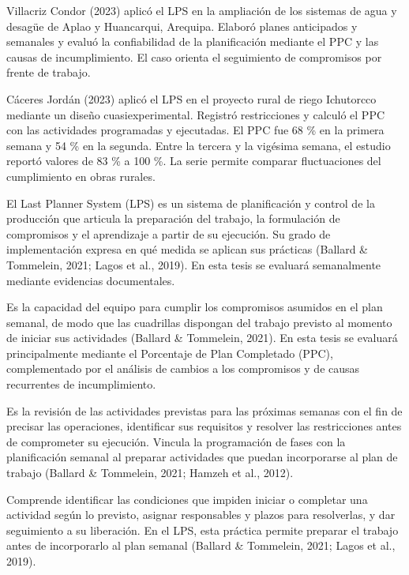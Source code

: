 \documentclass[12pt,a4paper]{article}
\begin{document}
Villacriz Condor (2023) aplicó el LPS en la ampliación de los sistemas de agua y desagüe de Aplao y Huancarqui, Arequipa. Elaboró planes anticipados y semanales y evaluó la confiabilidad de la planificación mediante el PPC y las causas de incumplimiento. El caso orienta el seguimiento de compromisos por frente de trabajo.

Cáceres Jordán (2023) aplicó el LPS en el proyecto rural de riego Ichutorcco mediante un diseño cuasiexperimental. Registró restricciones y calculó el PPC con las actividades programadas y ejecutadas. El PPC fue 68 \% en la primera semana y 54 \% en la segunda. Entre la tercera y la vigésima semana, el estudio reportó valores de 83 \% a 100 \%. La serie permite comparar fluctuaciones del cumplimiento en obras rurales.


El Last Planner System (LPS) es un sistema de planificación y control de la producción que articula la preparación del trabajo, la formulación de compromisos y el aprendizaje a partir de su ejecución. Su grado de implementación expresa en qué medida se aplican sus prácticas (Ballard \& Tommelein, 2021; Lagos et al., 2019). En esta tesis se evaluará semanalmente mediante evidencias documentales.

Es la capacidad del equipo para cumplir los compromisos asumidos en el plan semanal, de modo que las cuadrillas dispongan del trabajo previsto al momento de iniciar sus actividades (Ballard \& Tommelein, 2021). En esta tesis se evaluará principalmente mediante el Porcentaje de Plan Completado (PPC), complementado por el análisis de cambios a los compromisos y de causas recurrentes de incumplimiento.

Es la revisión de las actividades previstas para las próximas semanas con el fin de precisar las operaciones, identificar sus requisitos y resolver las restricciones antes de comprometer su ejecución. Vincula la programación de fases con la planificación semanal al preparar actividades que puedan incorporarse al plan de trabajo (Ballard \& Tommelein, 2021; Hamzeh et al., 2012).

Comprende identificar las condiciones que impiden iniciar o completar una actividad según lo previsto, asignar responsables y plazos para resolverlas, y dar seguimiento a su liberación. En el LPS, esta práctica permite preparar el trabajo antes de incorporarlo al plan semanal (Ballard \& Tommelein, 2021; Lagos et al., 2019).
\end{document}
